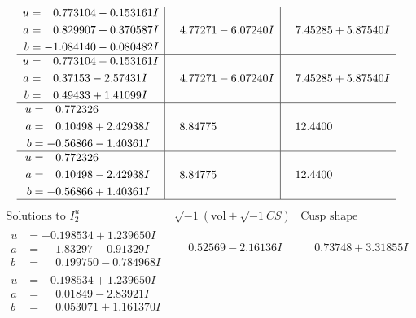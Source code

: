 \documentclass[1p]{elsarticle_modified}
\theoremstyle{definition}
\newcommand{\I}{\sqrt{-1}}
\begin{document}
$$\begin{array}{c|c|c}
\begin{aligned}
u &= \phantom{-}0.773104 - 0.153161 I \\
a &= \phantom{-}0.829907 + 0.370587 I \\
b &= -1.084140 - 0.080482 I\end{aligned}
 & \phantom{-}4.77271 - 6.07240 I & \phantom{-}7.45285 + 5.87540 I \\ \hline\begin{aligned}
u &= \phantom{-}0.773104 - 0.153161 I \\
a &= \phantom{-}0.37153 - 2.57431 I \\
b &= \phantom{-}0.49433 + 1.41099 I\end{aligned}
 & \phantom{-}4.77271 - 6.07240 I & \phantom{-}7.45285 + 5.87540 I \\ \hline\begin{aligned}
u &= \phantom{-}0.772326\phantom{ +0.000000I} \\
a &= \phantom{-}0.10498 + 2.42938 I \\
b &= -0.56866 - 1.40361 I\end{aligned}
 & \phantom{-}8.84775\phantom{ +0.000000I} & \phantom{-}12.4400\phantom{ +0.000000I} \\ \hline\begin{aligned}
u &= \phantom{-}0.772326\phantom{ +0.000000I} \\
a &= \phantom{-}0.10498 - 2.42938 I \\
b &= -0.56866 + 1.40361 I\end{aligned}
 & \phantom{-}8.84775\phantom{ +0.000000I} & \phantom{-}12.4400\phantom{ +0.000000I}\\
 \hline 
 \end{array}$$\newpage$$\begin{array}{c|c|c}  
\text{Solutions to }I^u_{2}& \I (\text{vol} + \sqrt{-1}CS) & \text{Cusp shape}\\
 \hline 
\begin{aligned}
u &= -0.198534 + 1.239650 I \\
a &= \phantom{-}1.83297 - 0.91329 I \\
b &= \phantom{-}0.199750 - 0.784968 I\end{aligned}
 & \phantom{-}0.52569 - 2.16136 I & \phantom{-}0.73748 + 3.31855 I \\ \hline\begin{aligned}
u &= -0.198534 + 1.239650 I \\
a &= \phantom{-}0.01849 - 2.83921 I \\
b &= \phantom{-}0.053071 + 1.161370 I\end{aligned}

\end{array}$$
\end{document}

